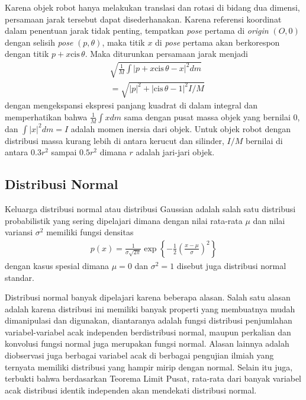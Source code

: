Karena objek robot hanya melakukan translasi dan rotasi di bidang dua dimensi, persamaan jarak tersebut dapat disederhanakan. Karena referensi koordinat dalam penentuan jarak tidak penting, tempatkan \textit{pose} pertama di \textit{origin} $(O, 0)$ dengan selisih \textit{pose} $(p, \theta)$, maka titik $x$ di \textit{pose} pertama akan berkorespon dengan titik $p + x \text{cis}\, \theta$. Maka diturunkan persamaan jarak menjadi
\begin{align}
     & \sqrt{\frac{1}{M}\int |p + x \text{cis}\, \theta - x|^2 dm} \\
     & = \sqrt{|p|^2 + |\text{cis}\, \theta - 1|^2 I/M}
\end{align}
dengan mengekspansi ekspresi panjang kuadrat di dalam integral dan memperhatikan bahwa $\frac{1}{M}\int x dm$ sama dengan pusat massa objek yang bernilai $0$, dan $\int |x|^2 dm = I$ adalah momen inersia dari objek. Untuk objek robot dengan distribusi massa kurang lebih di antara kerucut dan silinder, $I/M$ bernilai di antara $0.3r^2$ sampai $0.5r^2$ dimana $r$ adalah jari-jari objek.

\subsection{Distribusi Normal}

Keluarga distribusi normal atau distribusi Gaussian adalah salah satu distribusi probabilistik yang sering dipelajari dimana dengan nilai rata-rata $\mu$ dan nilai variansi $\sigma^2$ memiliki fungsi densitas
\begin{align}
    p(x) = \frac{1}{\sigma \sqrt{2\pi}} \exp\left\{-\frac{1}{2}\left(\frac{x-\mu}{\sigma}\right)^2\right\}
\end{align}
dengan kasus spesial dimana $\mu = 0$ dan $\sigma^2 = 1$ disebut juga distribusi normal standar.

Distribusi normal banyak dipelajari karena beberapa alasan. Salah satu alasan adalah karena distribusi ini memiliki banyak properti yang membuatnya mudah dimanipulasi dan digunakan, diantaranya adalah fungsi distribusi penjumlahan variabel-variabel acak independen berdistribusi normal, maupun perkalian dan konvolusi fungsi normal juga merupakan fungsi normal. Alasan lainnya adalah diobservasi juga berbagai variabel acak di berbagai pengujian ilmiah yang ternyata memiliki distribusi yang hampir mirip dengan normal. Selain itu juga, terbukti bahwa berdasarkan Teorema Limit Pusat, rata-rata dari banyak variabel acak distribusi identik independen akan mendekati distribusi normal. \citep{degroot2012}


